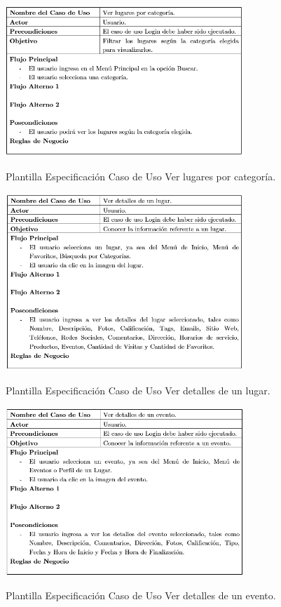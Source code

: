 \documentclass[12pt,letterpaper,openany]{book}
\begin{document}
\begin{table}[H]
\centering
\includegraphics[width=9cm]{./imagenes/PCU/ver_lugares_categoria}
\caption{Plantilla Especificación Caso de Uso Ver lugares por categoría.}
\end{table}

\begin{table}[H]
\centering
\includegraphics[width=9cm]{./imagenes/PCU/ver_detalles_lugar}
\caption{Plantilla Especificación Caso de Uso Ver detalles de un lugar.}
\end{table}

\begin{table}[H]
\centering
\includegraphics[width=9cm]{./imagenes/PCU/ver_detalles_evento}
\caption{Plantilla Especificación Caso de Uso Ver detalles de un evento.}
\end{table}
\end{document}
